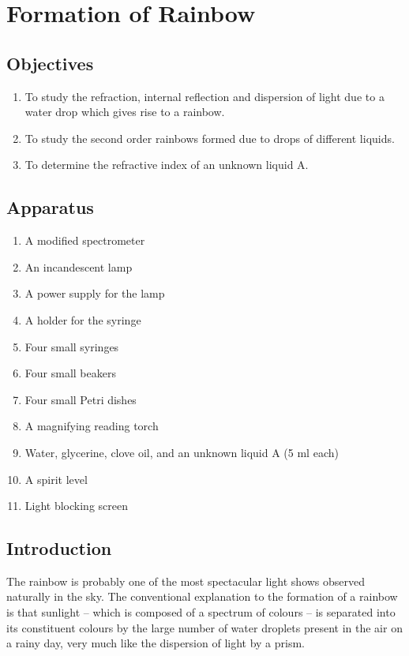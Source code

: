 \chapter{Formation of Rainbow}

\section*{Objectives}

\begin{enumerate}
\item To study the refraction, internal reflection and dispersion of light due to a water drop which gives rise to a rainbow.
\item To study the second order rainbows formed due to drops of different liquids. 
\item To determine the refractive index of an unknown liquid A.
\end{enumerate}

\section*{Apparatus}

\begin{enumerate}
\item A modified spectrometer 
\item An incandescent lamp
\item A power supply for the lamp
\item A holder for the syringe 
\item Four small syringes 
\item Four small beakers 
\item Four small Petri dishes 
\item A magnifying reading torch 
\item Water, glycerine, clove oil, and an unknown liquid A (5 ml each)
\item A spirit level 
\item Light blocking screen
\end{enumerate}

\section*{Introduction}
The rainbow is probably one of the most spectacular light shows observed naturally in the sky. The conventional explanation to the formation of a rainbow is that sunlight -- which is composed of a spectrum of colours -- is separated into its constituent colours by the large number of water droplets present in the air on a rainy day, very much like the dispersion of light by a prism. 

